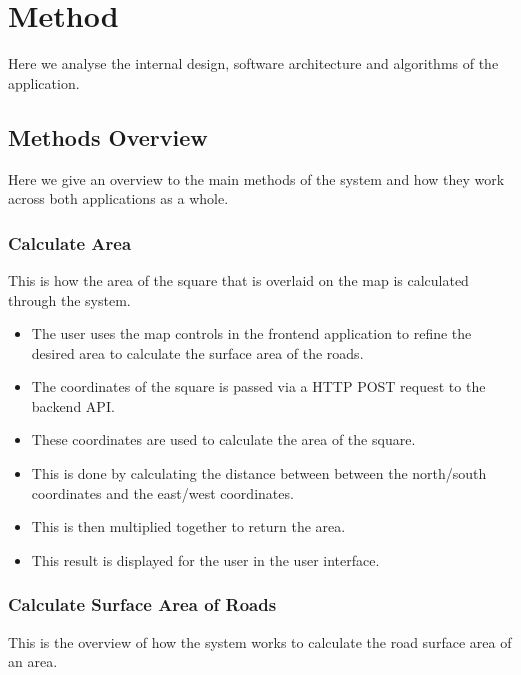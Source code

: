 \documentclass[a4paper,11pt]{article}
\begin{document}
\section{Method}

Here we analyse the internal design, software architecture and algorithms of
the application.

\subsection{Methods Overview}

Here we give an overview to the main methods of the system and how they work
across both applications as a whole.

\subsubsection{Calculate Area}

This is how the area of the square that is overlaid on the map is calculated
through the system.

\begin{itemize}
  \item The user uses the map controls in the frontend application to refine
    the desired area to calculate the surface area of the roads.
  \item The coordinates of the square is passed via a HTTP POST request to
    the backend API.\@
  \item These coordinates are used to calculate the area of the square.
  \item This is done by calculating the distance between between the
    north/south coordinates and the east/west coordinates.
  \item This is then multiplied together to return the area.
  \item This result is displayed for the user in the user interface.
\end{itemize}

\subsubsection{Calculate Surface Area of Roads}

This is the overview of how the system works to calculate the road surface area
of an area.
\end{document}
